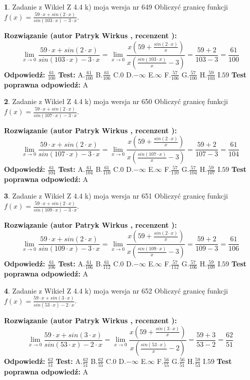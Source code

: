 \documentclass[12pt, a4paper]{article}
\theoremstyle{definition} %
\newtheorem{zad}{}
\newcommand{\zadStart}[1]{\begin{zad}#1\newline}
\newcommand{\zadStop}{\end{zad}}
\newcommand{\rozwStart}[2]{\noindent \textbf{Rozwiązanie (autor #1 , recenzent #2): }\newline}
\newcommand{\rozwStop}{\newline}
\newcommand{\odpStart}{\noindent \textbf{Odpowiedź:}\newline}
\newcommand{\odpStop}{\newline}
\newcommand{\testStart}{\noindent \textbf{Test:}\newline}
\newcommand{\testStop}{\newline}
\newcommand{\kluczStart}{\noindent \textbf{Test poprawna odpowiedź:}\newline}
\newcommand{\kluczStop}{\newline}
\begin{document}
\zadStart{Zadanie z Wikieł Z 4.4 k) moja wersja nr 649}
Obliczyć granicę funkcji $f(x)=\frac{59\cdot x +sin(2\cdot x)}{sin(103\cdot x) -3\cdot x}$.
\zadStop
\rozwStart{Patryk Wirkus}{}
$$\lim\limits_{x\to 0}\frac{59\cdot x +sin(2\cdot x)}{sin(103\cdot x) -3\cdot x}
=\lim\limits_{x\to 0}\frac{x(59+\frac{sin(2\cdot x)}{x})}{x(\frac{sin(103\cdot x)}{x}-3)}
=\frac{59+2}{103-3} = \frac{61}{100}$$
\rozwStop
\odpStart
$\frac{61}{100}$
\odpStop
\testStart
A.$\frac{61}{100}$
B.$\frac{61}{106}$
C.$0$
D.$-\infty$
E.$\infty$
F.$\frac{57}{106}$
G.$\frac{57}{100}$
H.$\frac{59}{103}$
I.$59$
\testStop
\kluczStart
A
\kluczStop



\zadStart{Zadanie z Wikieł Z 4.4 k) moja wersja nr 650}
Obliczyć granicę funkcji $f(x)=\frac{59\cdot x +sin(2\cdot x)}{sin(107\cdot x) -3\cdot x}$.
\zadStop
\rozwStart{Patryk Wirkus}{}
$$\lim\limits_{x\to 0}\frac{59\cdot x +sin(2\cdot x)}{sin(107\cdot x) -3\cdot x}
=\lim\limits_{x\to 0}\frac{x(59+\frac{sin(2\cdot x)}{x})}{x(\frac{sin(107\cdot x)}{x}-3)}
=\frac{59+2}{107-3} = \frac{61}{104}$$
\rozwStop
\odpStart
$\frac{61}{104}$
\odpStop
\testStart
A.$\frac{61}{104}$
B.$\frac{61}{110}$
C.$0$
D.$-\infty$
E.$\infty$
F.$\frac{57}{110}$
G.$\frac{57}{104}$
H.$\frac{59}{107}$
I.$59$
\testStop
\kluczStart
A
\kluczStop



\zadStart{Zadanie z Wikieł Z 4.4 k) moja wersja nr 651}
Obliczyć granicę funkcji $f(x)=\frac{59\cdot x +sin(2\cdot x)}{sin(109\cdot x) -3\cdot x}$.
\zadStop
\rozwStart{Patryk Wirkus}{}
$$\lim\limits_{x\to 0}\frac{59\cdot x +sin(2\cdot x)}{sin(109\cdot x) -3\cdot x}
=\lim\limits_{x\to 0}\frac{x(59+\frac{sin(2\cdot x)}{x})}{x(\frac{sin(109\cdot x)}{x}-3)}
=\frac{59+2}{109-3} = \frac{61}{106}$$
\rozwStop
\odpStart
$\frac{61}{106}$
\odpStop
\testStart
A.$\frac{61}{106}$
B.$\frac{61}{112}$
C.$0$
D.$-\infty$
E.$\infty$
F.$\frac{57}{112}$
G.$\frac{57}{106}$
H.$\frac{59}{109}$
I.$59$
\testStop
\kluczStart
A
\kluczStop



\zadStart{Zadanie z Wikieł Z 4.4 k) moja wersja nr 652}
Obliczyć granicę funkcji $f(x)=\frac{59\cdot x +sin(3\cdot x)}{sin(53\cdot x) -2\cdot x}$.
\zadStop
\rozwStart{Patryk Wirkus}{}
$$\lim\limits_{x\to 0}\frac{59\cdot x +sin(3\cdot x)}{sin(53\cdot x) -2\cdot x}
=\lim\limits_{x\to 0}\frac{x(59+\frac{sin(3\cdot x)}{x})}{x(\frac{sin(53\cdot x)}{x}-2)}
=\frac{59+3}{53-2} = \frac{62}{51}$$
\rozwStop
\odpStart
$\frac{62}{51}$
\odpStop
\testStart
A.$\frac{62}{51}$
B.$\frac{62}{55}$
C.$0$
D.$-\infty$
E.$\infty$
F.$\frac{56}{55}$
G.$\frac{56}{51}$
H.$\frac{59}{53}$
I.$59$
\testStop
\kluczStart
A
\kluczStop
\end{document}
